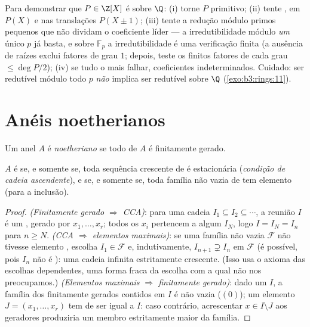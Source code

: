 \begin{method}\label{met:b3:rings:irreducibility}
Para demonstrar que $P \in \Z[X]$ é  sobre $\Q$: (i) torne
$P$ primitivo; (ii) tente , em $P(X)$ e nas
translações $P(X \pm
1)$; (iii) tente a redução módulo primos pequenos que não
dividam o coeficiente líder --- a irredutibilidade módulo \emph{um}
único $p$ já basta, e sobre $\mathbb F_p$ a irredutibilidade é uma
verificação finita (a ausência de raízes exclui fatores de grau
$1$; depois, teste os finitos fatores de cada grau $\leq \deg P/2$); (iv) se
tudo o mais falhar, coeficientes indeterminados. Cuidado: ser redutível
módulo todo $p$ \emph{não} implica ser redutível sobre $\Q$
(\cref{exo:b3:rings:11}).
\end{method}

\section{Anéis noetherianos}

\begin{definition}\label{def:b3:rings:noetherian}
Um anel $A$ é \emph{noetheriano} se todo
 de $A$ é finitamente gerado.
\end{definition}

\begin{proposition}\label{prop:b3:rings:noethacc}
$A$ é  se, e somente se, toda sequência crescente de
 é estacionária (\emph{condição de cadeia ascendente}), e se, e
somente se, toda família não vazia de  tem elemento  (para
a inclusão).
\end{proposition}

\begin{proof}
\emph{(Finitamente gerado $\Rightarrow$ CCA)}: para uma cadeia $I_1 \subseteq I_2
\subseteq \cdots$, a reunião
$I$ é um , gerado por $x_1,
\dots, x_r$; todos os $x_i$ pertencem a
algum $I_N$, logo $I = I_N = I_n$ para $n \geq N$. \emph{(CCA $\Rightarrow$ elementos
maximais)}: se uma família não vazia $\mathcal F$ não tivesse elemento
, escolha $I_1 \in
\mathcal F$ e, indutivamente, $I_{n+1} \supsetneq I_n$ em $\mathcal F$ (é possível,
pois $I_n$ não é ): uma cadeia infinita estritamente
crescente. (Isso usa o axioma das escolhas dependentes, uma forma fraca
da escolha com a qual não nos preocupamos.) \emph{(Elementos maximais
$\Rightarrow$ finitamente gerado)}: dado um  $I$, a família dos 
finitamente gerados contidos em $I$ é não vazia ($(0)$); um
elemento  $J = (x_1, \dots, x_r)$ tem de ser igual a $I$: caso contrário,
acrescentar $x \in I \setminus J$ aos geradores produziria um membro estritamente maior
da família.
\end{proof}

